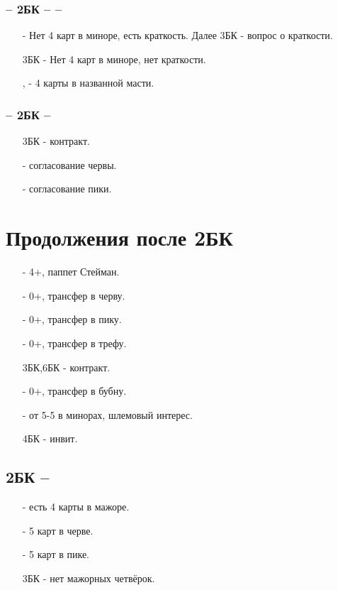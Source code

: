 \documentclass{article}
\begin{document}
\subsubsection{ -- 2БК --  -- }
\begin{enumerate}
    \item[\sp{3}] - Нет 4 карт в миноре, есть краткость. Далее 3БК - вопрос о краткости.
    \item[3БК] - Нет 4 карт в миноре, нет краткости.
    \item[\cl{4}, \di{4}] - 4 карты в названной масти.
\end{enumerate}
\subsubsection{ -- 2БК -- }
\begin{enumerate}
    \item[3БК] - контракт.
    \item[\cl{4}] - согласование червы.
    \item[\di{4}] - согласование пики.
\end{enumerate}
\section{Продолжения после 2БК}
\begin{enumerate}
    \item[\cl{3}] - 4+, паппет Стейман.
    \item[\di{3}] - 0+, трансфер в черву.
    \item[\he{3}] - 0+, трансфер в пику.
    \item[\sp{3}] - 0+, трансфер в трефу.
    \item[3БК,6БК] - контракт.
    \item[\cl{4}] - 0+, трансфер в бубну.
    \item[\sp{4}] - от 5-5 в минорах, шлемовый интерес.
    \item[4БК] - инвит.
\end{enumerate}
\subsection{2БК -- }
\begin{enumerate}
    \item[\di{3}] - есть 4 карты в мажоре.
    \item[\he{3}] - 5 карт в черве.
    \item[\sp{3}] - 5 карт в пике.
    \item[3БК] - нет мажорных четвёрок.
\end{enumerate}
\end{document}
